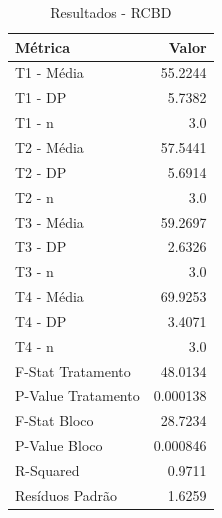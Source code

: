\begin{table}[H]
\centering
\caption{Resultados - RCBD}
\label{tab:resultados_rcbd}
\begin{tabular}{|l|r|}
\hline
\textbf{Métrica} & \textbf{Valor} \\
\hline
T1 - Média & 55.2244 \\
T1 - DP & 5.7382 \\
T1 - n & 3.0 \\
T2 - Média & 57.5441 \\
T2 - DP & 5.6914 \\
T2 - n & 3.0 \\
T3 - Média & 59.2697 \\
T3 - DP & 2.6326 \\
T3 - n & 3.0 \\
T4 - Média & 69.9253 \\
T4 - DP & 3.4071 \\
T4 - n & 3.0 \\
F-Stat Tratamento & 48.0134 \\
P-Value Tratamento & 0.000138 \\
F-Stat Bloco & 28.7234 \\
P-Value Bloco & 0.000846 \\
R-Squared & 0.9711 \\
Resíduos Padrão & 1.6259 \\
\hline
\end{tabular}
\end{table}
